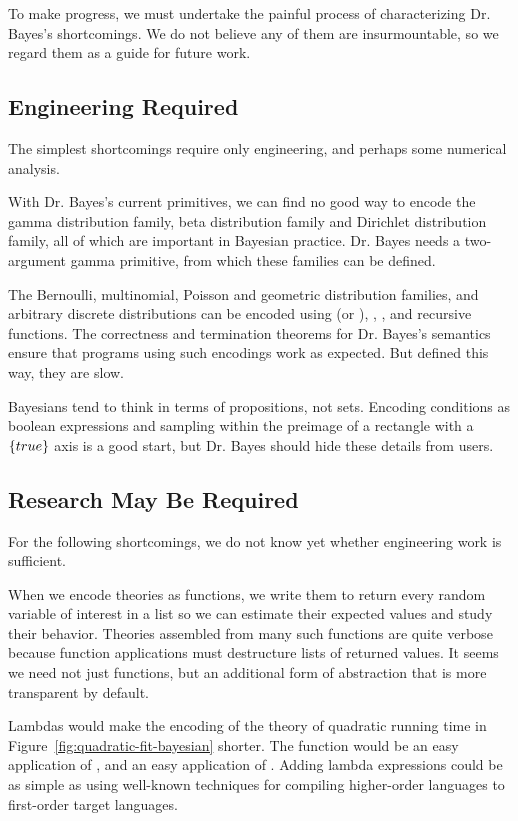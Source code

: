 To make progress, we must undertake the painful process of characterizing Dr. Bayes's shortcomings.
We do not believe any of them are insurmountable, so we regard them as a guide for future work.

\subsection{Engineering Required}

The simplest shortcomings require only engineering, and perhaps some numerical analysis.

With Dr. Bayes's current primitives, we can find no good way to encode the gamma distribution family, beta distribution family and Dirichlet distribution family, all of which are important in Bayesian practice.
Dr. Bayes needs a two-argument gamma primitive, from which these families can be defined.

The Bernoulli, multinomial, Poisson and geometric distribution families, and arbitrary discrete distributions can be encoded using  (or ), , \scheme{<}, and recursive functions.
The correctness and termination theorems for Dr. Bayes's semantics ensure that programs using such encodings work as expected.
But defined this way, they are slow.

Bayesians tend to think in terms of propositions, not sets.
Encoding conditions as boolean expressions and sampling within the preimage of a rectangle with a $\{{true}\}$ axis is a good start, but Dr. Bayes should hide these details from users.

\subsection{Research May Be Required}

For the following shortcomings, we do not know yet whether engineering work is sufficient.

When we encode theories as functions, we write them to return every random variable of interest in a list so we can estimate their expected values and study their behavior.
Theories assembled from many such functions are quite verbose because function applications must destructure lists of returned values.
It seems we need not just functions, but an additional form of abstraction that is more transparent by default.

Lambdas would make the encoding of the theory of quadratic running time in Figure~\ref{fig:quadratic-fit-bayesian} shorter.
The  function would be an easy application of , and  an easy application of .
Adding lambda expressions could be as simple as using well-known techniques for compiling higher-order languages to first-order target languages.

